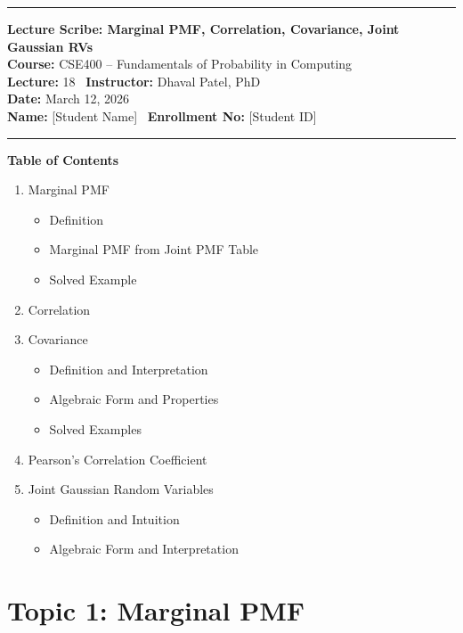 \documentclass[11pt]{article}
\begin{document}
\begin{center}
\hrule \vspace{0.4cm}
{\Large \textbf{Lecture Scribe: Marginal PMF, Correlation, Covariance, Joint Gaussian RVs}}\\[0.2cm]
\textbf{Course:} CSE400 – Fundamentals of Probability in Computing\\[0.1cm]
\textbf{Lecture:} 18 \textbar\ \textbf{Instructor:} Dhaval Patel, PhD\\[0.1cm]
\textbf{Date:} March 12, 2026\\[0.1cm]
\textbf{Name:} [Student Name] \textbar\ \textbf{Enrollment No:} [Student ID]
\vspace{0.3cm} \hrule
\end{center}

\vspace{0.5cm}

\textbf{\Large Table of Contents}
\begin{enumerate}[label=\textbf{\arabic*.}, leftmargin=*]
    \item Marginal PMF
    \begin{itemize}[label=--]
        \item Definition
        \item Marginal PMF from Joint PMF Table
        \item Solved Example
    \end{itemize}
    \item Correlation
    \item Covariance
    \begin{itemize}[label=--]
        \item Definition and Interpretation
        \item Algebraic Form and Properties
        \item Solved Examples
    \end{itemize}
    \item Pearson’s Correlation Coefficient
    \item Joint Gaussian Random Variables
    \begin{itemize}[label=--]
        \item Definition and Intuition
        \item Algebraic Form and Interpretation
    \end{itemize}
\end{enumerate}

\newpage

\section*{Topic 1: Marginal PMF}
\end{document}
